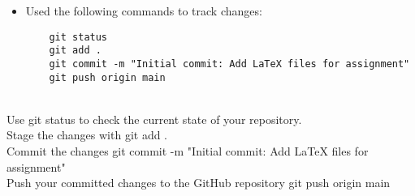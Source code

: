 \documentclass[a4paper,12pt]{article}
\begin{document}
\begin{itemize}
    \item Used the following commands to track changes:
    \begin{verbatim}
    git status
    git add .
    git commit -m "Initial commit: Add LaTeX files for assignment"
    git push origin main
    \end{verbatim}
\end{itemize}
\\Use git status to check the current state of your repository.
\\Stage the changes with git add .
\\Commit the changes git commit -m "Initial commit: Add LaTeX files for assignment"
\\Push your committed changes to the GitHub repository  git push origin main
\\
\\
\\
\\
\end{document}
